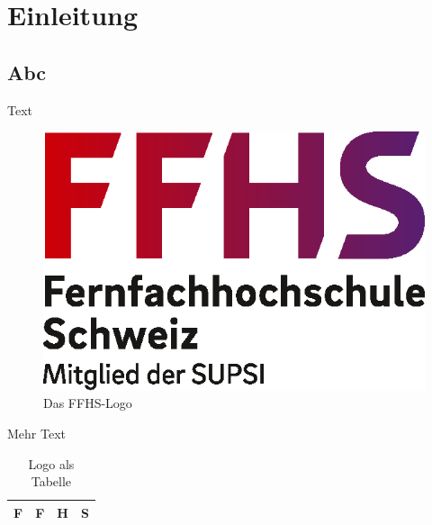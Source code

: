 \chapter{Einleitung}
\section{Abc}

Text

\begin{figure}[ht]
  \begin{center}
  \includegraphics{graphics/ffhs_logo_de.eps}
  \end{center}
  \caption{Das FFHS-Logo}
\end{figure}


Mehr Text
 
\begin{table}[ht]
  \begin{center}
  \begin{tabular}{|c|c|c|c|}
  \hline
  F & F & H & S \\
  \hline
  \end{tabular}
  \end{center}
  \caption{Logo als Tabelle}
\end{table}